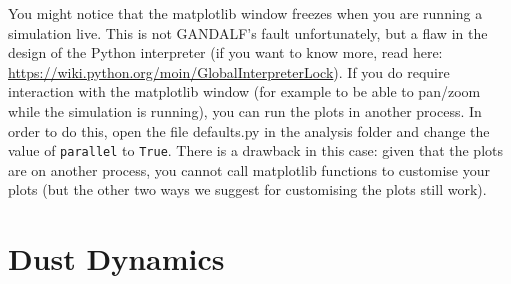 \documentclass[a4paper]{article}
\newcommand{\var}[1]{\texttt{#1}}
\begin{document}
You might notice that the matplotlib window freezes when you are running a simulation live. This is not GANDALF's fault unfortunately, but a flaw in the design of the Python interpreter (if you want to know more, read here: \url{https://wiki.python.org/moin/GlobalInterpreterLock}). If you do require interaction with the matplotlib window (for example to be able to pan/zoom while the simulation is running), you can run the plots in another process. In order to do this, open the file defaults.py in the analysis folder and change the value of \var{parallel} to \lstinline{True}. There is a drawback in this case: given that the plots are on another process, you cannot call matplotlib functions to customise your plots (but the other two ways we suggest for customising the plots still work).

\newpage

\section{Dust Dynamics}
\end{document}
